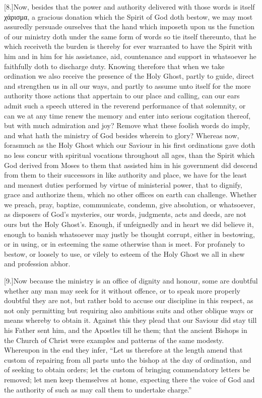 [8.]Now, besides that the power and authority delivered with those words is itself χάρισμα, a gracious donation which the Spirit of God doth bestow, we may most assuredly persuade ourselves that the hand which imposeth upon us the function of our ministry doth under the same form of words so tie itself thereunto, that he which receiveth the burden is thereby for ever warranted to have the Spirit with him and in him for his assistance, aid, countenance and support in whatsoever he faithfully doth to discharge duty. Knowing therefore that when we take ordination we also receive the presence of the Holy Ghost, partly to guide, direct and strengthen us in all our ways, and partly to assume unto itself for the more authority those actions that appertain to our place and calling, can our ears admit such a speech uttered in the reverend performance of that solemnity, or can we at any time renew the memory and enter into serious cogitation thereof, but with much admiration and joy? Remove what these foolish words do imply, and what hath the ministry of God besides wherein to glory? Whereas now, forasmuch as the Holy Ghost which our Saviour in his first ordinations gave doth no less concur with spiritual vocations throughout all ages, than the Spirit which God derived from Moses to them that assisted him in his government did descend from them to their successors in like authority and place, we have for the least and meanest duties performed by virtue of ministerial power, that to dignify, grace and authorize them, which no other offices on earth can challenge. Whether we  preach,
 pray, baptize, communicate, condemn, give absolution, or whatsoever, as disposers of God’s mysteries, our words, judgments, acts and deeds, are not ours but the Holy Ghost’s. Enough, if unfeignedly and in heart we did believe it, enough to banish whatsoever may justly be thought corrupt, either in bestowing, or in using, or in esteeming the same otherwise than is meet. For profanely to bestow, or loosely to use, or vilely to esteem of the Holy Ghost we all in shew and profession abhor.

[9.]Now because the ministry is an office of dignity and honour, some are doubtful whether any man may seek for it without offence, or to speak more properly doubtful they are not, but rather bold to accuse our discipline in this respect, as not only permitting but requiring also ambitious suits and other oblique ways or means whereby to obtain it. Against this they plead that our Saviour did stay till his Father sent him, and the Apostles till he them; that the ancient Bishops in the Church of Christ were examples and patterns of the same modesty. Whereupon in the end they infer, “Let us therefore at the length amend that custom of repairing from all parts unto the bishop at the day of ordination, and of seeking to obtain orders; let the custom of bringing commendatory letters be removed; let men keep themselves at home, expecting there the voice of God and the authority of such as may call them to undertake charge.”

